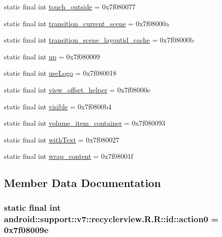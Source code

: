\begin{CompactItemize}
\item 
static final int \hyperlink{classandroid_1_1support_1_1v7_1_1recyclerview_1_1_r_1_1id_072fb7ee3a52e21ee8fb2507fb638bdb}{touch\_\-outside} = 0x7f080077
\item 
static final int \hyperlink{classandroid_1_1support_1_1v7_1_1recyclerview_1_1_r_1_1id_5750f412107fc8674634fd7961377249}{transition\_\-current\_\-scene} = 0x7f08000a
\item 
static final int \hyperlink{classandroid_1_1support_1_1v7_1_1recyclerview_1_1_r_1_1id_0a1186bce6cec48734ab3296fa125c6c}{transition\_\-scene\_\-layoutid\_\-cache} = 0x7f08000b
\item 
static final int \hyperlink{classandroid_1_1support_1_1v7_1_1recyclerview_1_1_r_1_1id_d1fafac92497ec8d0e3e1ec46b0359f8}{up} = 0x7f080009
\item 
static final int \hyperlink{classandroid_1_1support_1_1v7_1_1recyclerview_1_1_r_1_1id_c9eddebbea1685a5f7e06aeaa6a5f120}{useLogo} = 0x7f080018
\item 
static final int \hyperlink{classandroid_1_1support_1_1v7_1_1recyclerview_1_1_r_1_1id_908c767aedfc0214876dd88090204ab9}{view\_\-offset\_\-helper} = 0x7f08000e
\item 
static final int \hyperlink{classandroid_1_1support_1_1v7_1_1recyclerview_1_1_r_1_1id_54a5e5adc1010331ab4cee2a5a72f91d}{visible} = 0x7f0800b4
\item 
static final int \hyperlink{classandroid_1_1support_1_1v7_1_1recyclerview_1_1_r_1_1id_c645f40a33c5b6d74b34100fa030e95c}{volume\_\-item\_\-container} = 0x7f080093
\item 
static final int \hyperlink{classandroid_1_1support_1_1v7_1_1recyclerview_1_1_r_1_1id_75a746de72528c3e6c149d29ef18c66e}{withText} = 0x7f080027
\item 
static final int \hyperlink{classandroid_1_1support_1_1v7_1_1recyclerview_1_1_r_1_1id_c260f9d95cfbea28508cebb5a1567960}{wrap\_\-content} = 0x7f08001f
\end{CompactItemize}


\subsection{Member Data Documentation}
\hypertarget{classandroid_1_1support_1_1v7_1_1recyclerview_1_1_r_1_1id_70c8a896eb75fe5dd8043f9e8521007d}{
\subsubsection[{action0}]{\setlength{\rightskip}{0pt plus 5cm}static final int android::support::v7::recyclerview.R.R::id::action0 = 0x7f08009e}}
\label{classandroid_1_1support_1_1v7_1_1recyclerview_1_1_r_1_1id_70c8a896eb75fe5dd8043f9e8521007d}


